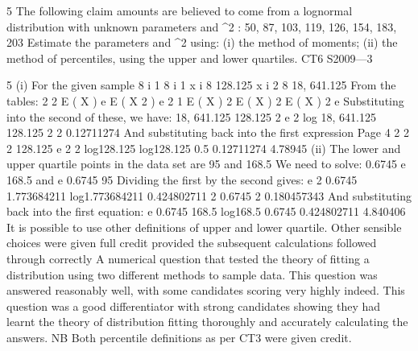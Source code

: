 \documentclass[a4paper,12pt]{article}
\begin{document}
5
The following claim amounts are believed to come from a lognormal distribution with
unknown parameters \mu and \sigma^2  :
50, 87, 103, 119, 126, 154, 183, 203
Estimate the parameters \mu and \sigma^2  using:
(i) the method of moments;
(ii) the method of percentiles, using the upper and lower quartiles.
CT6 S2009—3



5
(i) For the given sample
8
i 1
8
i 1
x i
8 128.125
x i 2
8 18, 641.125
From the tables:
2
2
E ( X ) e
E ( X 2 )
e
2
1 E ( X ) 2
E ( X ) 2
E ( X ) 2 e
Substituting into the second of these, we have:
18, 641.125 128.125 2 e
2
log
18, 641.125
128.125 2
2
0.12711274
And substituting back into the first expression
Page 4
2%
2
2
128.125 e
2
2
log128.125
log128.125 0.5 0.12711274 4.78945
(ii) The lower and upper quartile points in the data set are 95 and 168.5
We need to solve:
0.6745
e
168.5 and e
0.6745
95
Dividing the first by the second gives:
e 2
0.6745
1.773684211
log1.773684211
0.424802711
2 0.6745
2
0.180457343
And substituting back into the first equation:
e
0.6745
168.5
log168.5 0.6745 0.424802711
4.840406
It is possible to use other definitions of upper and lower quartile. Other sensible
choices were given full credit provided the subsequent calculations followed
through correctly
A numerical question that tested the theory of fitting a distribution using two different
methods to sample data. This question was answered reasonably well, with some
candidates scoring very highly indeed. This question was a good differentiator with
strong candidates showing they had learnt the theory of distribution fitting thoroughly
and accurately calculating the answers. NB Both percentile definitions as per CT3
were given credit.
\end{document}
